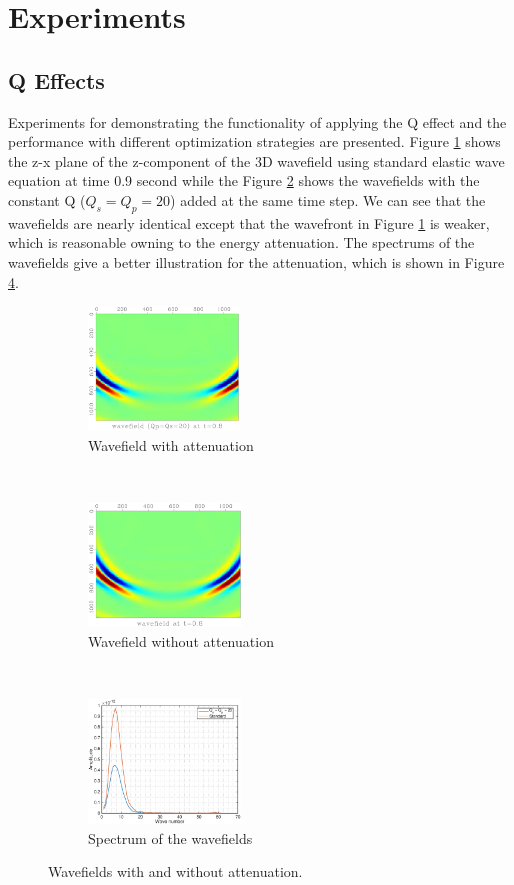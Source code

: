\documentclass{paris17}
\begin{document}
\section{Experiments}

\subsection{Q Effects}
Experiments for demonstrating the functionality of applying the Q effect and the performance with different optimization strategies are presented. Figure \ref{fig:with-attenuation} shows the z-x plane of the z-component of the 3D wavefield using standard elastic wave equation at time 0.9 second while the Figure \ref{fig:without-attenuation} shows the wavefields with the constant Q ($Q_s=Q_p=20$) added at the same time step. We can see that the wavefields are nearly identical except that the wavefront in Figure \ref{fig:with-attenuation} is weaker, which is reasonable owning to the energy attenuation. The spectrums of the wavefields give a better illustration for the attenuation, which is shown in Figure \ref{fig:spectrum}.

\begin{figure}[h]
    \centering
    \begin{subfigure}[b]{0.3\textwidth}
        \centering
        \includegraphics[height=1.3in]{./fig/q20.pdf}
        \caption{Wavefield with attenuation}
        \label{fig:with-attenuation}
    \end{subfigure}
    ~
    \begin{subfigure}[b]{0.3\textwidth}
        \centering
        \includegraphics[height=1.3in]{./fig/std.pdf}
        \caption{Wavefield without attenuation}
        \label{fig:without-attenuation}
    \end{subfigure}%
    ~
    \begin{subfigure}[b]{0.3\textwidth}
        \centering
        \includegraphics[height=1.3in]{./fig/spec.eps}
        \caption{Spectrum of the wavefields}
        \label{fig:spectrum}
    \end{subfigure}
    \caption{Wavefields with and without attenuation.}
\end{figure}
\end{document}
